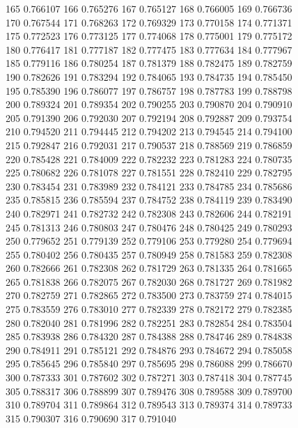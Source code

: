 \begin{figure}
{    165 0.766107
    166 0.765276
    167 0.765127
    168 0.766005
    169 0.766736
    170 0.767544
    171 0.768263
    172 0.769329
    173 0.770158
    174 0.771371
    175 0.772523
    176 0.773125
    177 0.774068
    178 0.775001
    179 0.775172
    180 0.776417
    181 0.777187
    182 0.777475
    183 0.777634
    184 0.777967
    185 0.779116
    186 0.780254
    187 0.781379
    188 0.782475
    189 0.782759
    190 0.782626
    191 0.783294
    192 0.784065
    193 0.784735
    194 0.785450
    195 0.785390
    196 0.786077
    197 0.786757
    198 0.787783
    199 0.788798
    200 0.789324
    201 0.789354
    202 0.790255
    203 0.790870
    204 0.790910
    205 0.791390
    206 0.792030
    207 0.792194
    208 0.792887
    209 0.793754
    210 0.794520
    211 0.794445
    212 0.794202
    213 0.794545
    214 0.794100
    215 0.792847
    216 0.792031
    217 0.790537
    218 0.788569
    219 0.786859
    220 0.785428
    221 0.784009
    222 0.782232
    223 0.781283
    224 0.780735
    225 0.780682
    226 0.781078
    227 0.781551
    228 0.782410
    229 0.782795
    230 0.783454
    231 0.783989
    232 0.784121
    233 0.784785
    234 0.785686
    235 0.785815
    236 0.785594
    237 0.784752
    238 0.784119
    239 0.783490
    240 0.782971
    241 0.782732
    242 0.782308
    243 0.782606
    244 0.782191
    245 0.781313
    246 0.780803
    247 0.780476
    248 0.780425
    249 0.780293
    250 0.779652
    251 0.779139
    252 0.779106
    253 0.779280
    254 0.779694
    255 0.780402
    256 0.780435
    257 0.780949
    258 0.781583
    259 0.782308
    260 0.782666
    261 0.782308
    262 0.781729
    263 0.781335
    264 0.781665
    265 0.781838
    266 0.782075
    267 0.782030
    268 0.781727
    269 0.781982
    270 0.782759
    271 0.782865
    272 0.783500
    273 0.783759
    274 0.784015
    275 0.783559
    276 0.783010
    277 0.782339
    278 0.782172
    279 0.782385
    280 0.782040
    281 0.781996
    282 0.782251
    283 0.782854
    284 0.783504
    285 0.783938
    286 0.784320
    287 0.784388
    288 0.784746
    289 0.784838
    290 0.784911
    291 0.785121
    292 0.784876
    293 0.784672
    294 0.785058
    295 0.785645
    296 0.785840
    297 0.785695
    298 0.786088
    299 0.786670
    300 0.787333
    301 0.787602
    302 0.787271
    303 0.787418
    304 0.787745
    305 0.788317
    306 0.788899
    307 0.789476
    308 0.789588
    309 0.789700
    310 0.789704
    311 0.789864
    312 0.789543
    313 0.789374
    314 0.789733
    315 0.790307
    316 0.790690
    317 0.791040
}
\end{figure}
